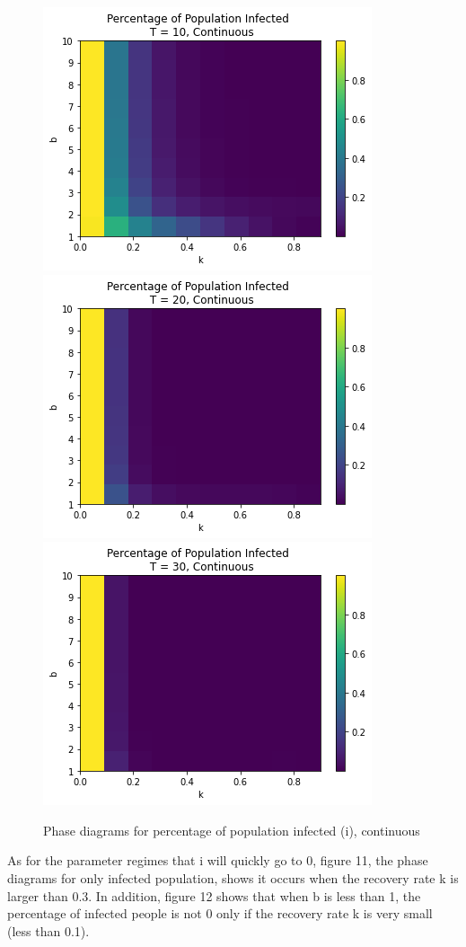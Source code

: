 \documentclass{article}
\begin{document}
\begin{figure}[htp]

\centering
\includegraphics[width=.3\textwidth]{Figure2_ode_infectT10.png}\hfill
\includegraphics[width=.3\textwidth]{Figure2_ode_infectT20.png}\hfill
\includegraphics[width=.3\textwidth]{Figure2_ode_infectT30.png}

\caption{Phase diagrams for percentage of population infected (i), continuous}
\label{fig:figure3}

\end{figure}



As for the parameter regimes that i will quickly go to 0, figure 11, the phase diagrams for only infected population, shows it occurs when the recovery rate k is larger than 0.3.
In addition, figure 12 shows that when b is less than 1, the percentage of infected people is not 0 only if the recovery rate k is very small (less than 0.1).
\end{document}
